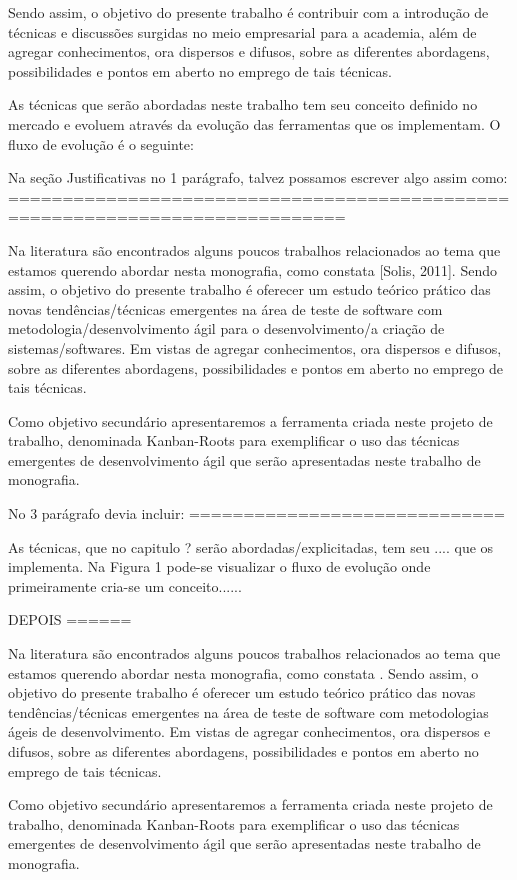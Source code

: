   Sendo assim, o objetivo do presente trabalho é contribuir com a introdução de técnicas e discussões surgidas no meio empresarial para a academia, além de agregar conhecimentos, ora dispersos e difusos, sobre as diferentes abordagens, possibilidades e pontos em aberto no emprego de tais técnicas.

  As técnicas que serão abordadas neste trabalho tem seu conceito definido no mercado e evoluem através da evolução das ferramentas que os implementam. O fluxo de evolução é o seguinte:


  Na seção Justificativas no 1 parágrafo, talvez possamos escrever algo assim como:
  =============================================================================

  Na literatura são encontrados alguns poucos trabalhos relacionados ao tema que estamos querendo abordar nesta monografia, como constata [Solis, 2011]. Sendo assim, o objetivo do presente trabalho é oferecer um estudo teórico prático das novas tendências/técnicas emergentes na área de teste de software com metodologia/desenvolvimento ágil para o desenvolvimento/a criação de sistemas/softwares. Em vistas de agregar conhecimentos, ora dispersos e difusos, sobre as diferentes abordagens, possibilidades e pontos em aberto no emprego de tais técnicas.

  Como objetivo secundário apresentaremos a ferramenta criada neste projeto de trabalho, denominada Kanban-Roots para exemplificar o uso das técnicas emergentes de desenvolvimento ágil que serão apresentadas neste trabalho de monografia.

  No 3 parágrafo devia incluir:
  =============================

  As técnicas, que no capitulo ? serão abordadas/explicitadas, tem seu .... que os implementa. Na Figura 1 pode-se visualizar o fluxo de evolução onde primeiramente cria-se um conceito......


  DEPOIS
  ======

  Na literatura são encontrados alguns poucos trabalhos relacionados ao tema que estamos querendo abordar nesta monografia, como constata . Sendo assim, o objetivo do presente trabalho é oferecer um estudo teórico prático das novas tendências/técnicas emergentes na área de teste de software com metodologias ágeis de desenvolvimento. Em vistas de agregar conhecimentos, ora dispersos e difusos, sobre as diferentes abordagens, possibilidades e pontos em aberto no emprego de tais técnicas.

  Como objetivo secundário apresentaremos a ferramenta criada neste projeto de trabalho, denominada Kanban-Roots para exemplificar o uso das técnicas emergentes de desenvolvimento ágil que serão apresentadas neste trabalho de monografia.

